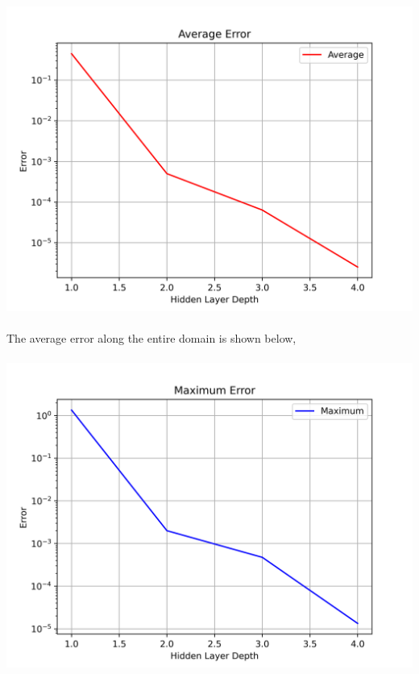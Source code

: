 \documentclass[a4paper, 12pt]{report}
\def\size{0.92}
\begin{document}
\begin{center}
\\~\\\includegraphics[scale=\size]{depthMean.png}
\\~\\The average error along the entire domain is shown below,
\\~\\\includegraphics[scale=\size]{depthMax.png}



\end{center}
\end{document}
